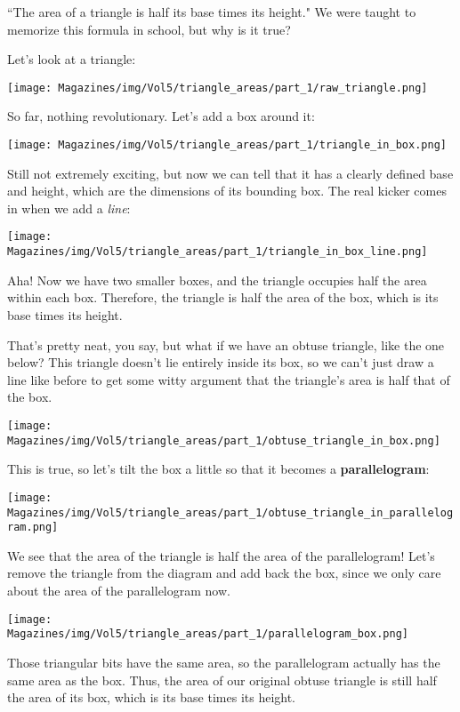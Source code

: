 \documentclass{article}
\begin{document}
\begin{multicols}{3}
``The area of a triangle is half its base times its height." We were taught to memorize this formula in school, but why is it true?

Let's look at a triangle:
\begin{center}
    \centering
    \texttt{[image: Magazines/img/Vol5/triangle\_areas/part\_1/raw\_triangle.png]}
\end{center}
So far, nothing revolutionary. Let's add a box around it:
\begin{center}
    \centering
    \texttt{[image: Magazines/img/Vol5/triangle\_areas/part\_1/triangle\_in\_box.png]}
\end{center}
Still not extremely exciting, but now we can tell that it has a clearly defined base and height, which are the dimensions of its bounding box. The real kicker comes in when we add a \textit{line}:
\begin{center}
    \centering
    \texttt{[image: Magazines/img/Vol5/triangle\_areas/part\_1/triangle\_in\_box\_line.png]}
\end{center}
Aha! Now we have two smaller boxes, and the triangle occupies half the area within each box. Therefore, the triangle is half the area of the box, which is its base times its height.

That's pretty neat, you say, but what if we have an obtuse triangle, like the one below? This triangle doesn't lie entirely inside its box, so we can't just draw a line like before to get some witty argument that the triangle's area is half that of the box.
\begin{center}
    \centering
    \texttt{[image: Magazines/img/Vol5/triangle\_areas/part\_1/obtuse\_triangle\_in\_box.png]}
\end{center}
This is true, so let's tilt the box a little so that it becomes a \textbf{parallelogram}:
\begin{center}
    \centering
    \texttt{[image: Magazines/img/Vol5/triangle\_areas/part\_1/obtuse\_triangle\_in\_parallelogram.png]}
\end{center}
We see that the area of the triangle is half the area of the parallelogram! Let's remove the triangle from the diagram and add back the box, since we only care about the area of the parallelogram now.
\begin{center}
    \centering
    \texttt{[image: Magazines/img/Vol5/triangle\_areas/part\_1/parallelogram\_box.png]}
\end{center}
Those triangular bits have the same area, so the parallelogram actually has the same area as the box. Thus, the area of our original obtuse triangle is still half the area of its box, which is its base times its height.


\end{multicols}
\end{document}
